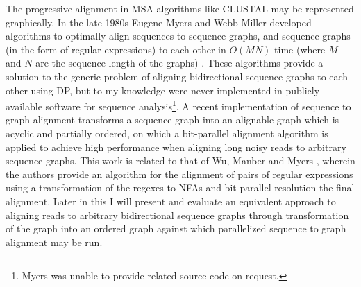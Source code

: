 The progressive alignment in MSA algorithms like CLUSTAL may be represented graphically.
In the late 1980s Eugene Myers and Webb Miller developed algorithms to optimally align sequences to sequence graphs, and sequence graphs (in the form of regular expressions) to each other in $O(MN)$ time (where $M$ and $N$ are the sequence length of the graphs) \cite{myers1989approximate,wu1995subquadratic}.
These algorithms provide a solution to the generic problem of aligning bidirectional sequence graphs to each other using DP, but to my knowledge were never implemented in publicly available software for sequence analysis\footnote{Myers was unable to provide related source code on request.}.
A recent implementation of sequence to graph alignment \cite{rautiainen2018bit} transforms a sequence graph into an alignable graph which is acyclic and partially ordered, on which a bit-parallel alignment algorithm is applied to achieve high performance when aligning long noisy reads to arbitrary sequence graphs.
This work is related to that of Wu, Manber and Myers \cite{wu1995subquadratic}, wherein the authors provide an algorithm for the alignment of pairs of regular expressions using a transformation of the regexes to NFAs and bit-parallel resolution the final alignment.
Later in this I will present and evaluate an equivalent approach to aligning reads to arbitrary bidirectional sequence graphs through transformation of the graph into an ordered graph against which parallelized sequence to graph alignment may be run.

